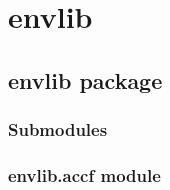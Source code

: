 \documentclass[a4paper,11pt,english]{sphinxmanual}
\begin{document}
\section{envlib}
\label{\detokenize{modules:envlib}}\label{\detokenize{modules::doc}}

\subsection{envlib package}
\label{\detokenize{envlib:envlib-package}}\label{\detokenize{envlib::doc}}

\subsubsection{Submodules}
\label{\detokenize{envlib:submodules}}

\subsubsection{envlib.accf module}
\label{\detokenize{envlib:module-envlib.accf}}\label{\detokenize{envlib:envlib-accf-module}}
\end{document}

